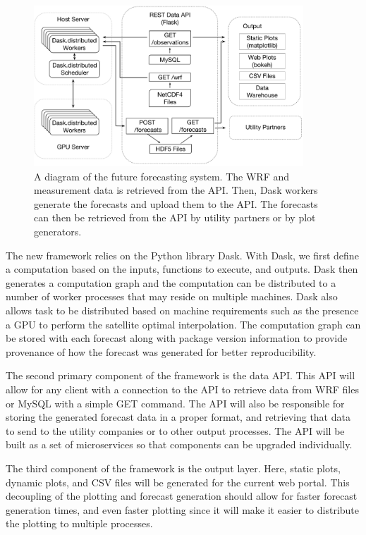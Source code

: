 \begin{figure}[htb]
\centering
\includegraphics[width=0.9\textwidth]{figs/nabudiagram.pdf}
\caption[Diagram of the future forecasting system]{A diagram of the
future forecasting system. The WRF and measurement data is retrieved
from the API. Then, Dask workers generate the forecasts and upload
them to the API. The forecasts can then be retrieved from the API by
utility partners or by plot generators.}
\label{fig:nabu}
\end{figure}

The new framework relies on the Python library Dask.
With Dask, we first define a computation based on the inputs,
functions to execute, and outputs.
Dask then generates a computation graph and the computation can be
distributed to a number of worker processes that may reside on
multiple machines.
Dask also allows task to be distributed based on machine requirements
such as the presence a GPU to perform the satellite optimal interpolation.
The computation graph can be stored with each forecast along with
package version information to provide provenance of how the forecast
was generated for better reproducibility.

The second primary component of the framework is the data API.
This API will allow for any client with a connection to the API to
retrieve data from WRF files or MySQL with a simple GET command.
The API will also be responsible for storing the generated forecast
data in a proper format, and retrieving that data to send to the
utility companies or to other output processes.
The API will be built as a set of microservices so that components can
be upgraded individually.

The third component of the framework is the output layer.
Here, static plots, dynamic plots, and CSV files will be generated for
the current web portal.
This decoupling of the plotting and forecast generation should allow
for faster forecast generation times, and even faster plotting since
it will make it easier to distribute the plotting to multiple
processes.




